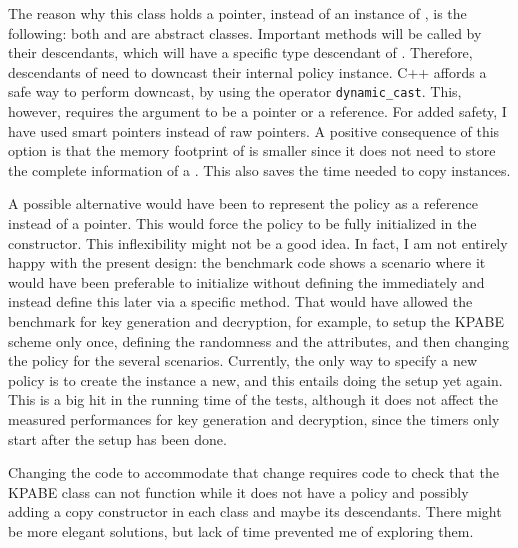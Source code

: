 \documentclass{article}
\begin{document}
The reason why this class holds a pointer, instead of an instance of \cAP, is the following: both \cSS and \cAP are abstract classes. Important methods will be called by their descendants, which will have a specific type descendant of \cAP. Therefore, descendants of \cSS need to downcast their internal policy instance. C++ affords a safe way to perform downcast, by using the operator \verb|dynamic_cast|. This, however, requires the argument to be a pointer or a reference. For added safety, I have used smart pointers instead of raw pointers. A positive consequence of this option is that the memory footprint of \cSS is smaller since it does not need to store the complete information of a \cAP. This also saves the time needed to copy instances.

A possible alternative would have been to represent the policy as a reference instead of a pointer. This would force the policy to be fully initialized in the constructor. This inflexibility might not be a good idea. In fact, I am not entirely happy with the present design: the benchmark code shows a scenario where it would have been preferable to initialize \cSS without defining the \cAP immediately and instead define this later via a specific method. That would have allowed the benchmark for key generation and decryption, for example, to setup the KPABE scheme only once, defining the randomness and the attributes, and then changing the policy for the several scenarios. Currently, the only way to specify a new policy is to create the instance a new, and this entails doing the setup yet again. This is a big hit in the running time of the tests, although it does not affect the measured performances for key generation and decryption, since the timers only start after the setup has been done.

Changing the code to accommodate that change requires code to check that the KPABE class can not function while it does not have a policy and possibly adding a copy constructor in each \cSS class and maybe its descendants. There might be more elegant solutions, but lack of time prevented me of exploring them. 
\end{document}
